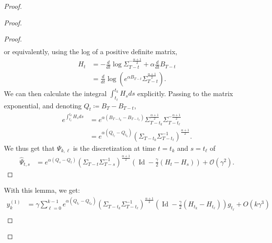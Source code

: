 \documentclass[11pt]{article}
\newcommand{\eqdef}{\coloneqq}
\newcommand{\id}{\operatorname{Id}}
\begin{document}
\begin{proof}
\begin{proof}
\begin{proof}
\begin{align*}
\end{align*}
or equivalently, using the log of a positive definite matrix, 
\begin{align*}
 H_t &= -\frac{d}{dt} \log \Sigma_{T-t}^{-\frac{\alpha + 1}{2}}  + \alpha \frac{d}{dt} B_{T-t} \\
 &= \frac{d}{dt}  \log \left( e^{\alpha B_{T-t}} \Sigma_{T-t}^{\frac{\alpha + 1}{2}} \right).
\end{align*}
We can then calculate the integral $\int_{t_\ell}^{t_k} H_s ds$ explicitly. Passing to the matrix exponential, and denoting $Q_t \eqdef B_{T} - B_{T-t}$,
\begin{align*}
e^{\int_{t_\ell}^{t_k} H_s ds} &= e^{\alpha (B_{T-t_k} - B_{T-t_\ell})} \Sigma_{T-t_k}^{\frac{\alpha + 1}{2}} \Sigma_{T-t_\ell}^{-\frac{\alpha + 1}{2}} \\
&= e^{\alpha (Q_{t_\ell} - Q_{t_k})} \left( \Sigma_{T-t_k} \Sigma_{T-t_\ell}^{-1} \right)^{\frac{\alpha + 1}{2}}.
\end{align*}
We thus get that $\Psi_{k,\ell}$ is the discretization at time $t = t_k$ and $s = t_\ell$ of 
\begin{align*}
\hat \Psi_{t,s} &= e^{\alpha (Q_{s} - Q_{t})} \left( \Sigma_{T-t} \Sigma_{T-s}^{-1} \right)^{\frac{\alpha + 1}{2}}(\id - \frac{\gamma}{2}(H_{t} - H_{s})) + \mathcal{O}(\gamma^2) .
\end{align*}
\end{proof}
With this lemma, we get:
\begin{align*}
    y^{(1)}_k &= \gamma \sum_{\ell=0}^{k-1} e^{\alpha (Q_{t_\ell} - Q_{t_k})} \left( \Sigma_{T-t_k} \Sigma_{T-t_\ell}^{-1} \right)^{\frac{\alpha+1}{2}} \left(\id - \frac{\gamma}{2}(H_{t_{k}} - H_{t_\ell})\right)g_{t_\ell} + O(k\gamma^3) \\

\end{align*}
\end{proof}
\end{proof}
\end{document}
